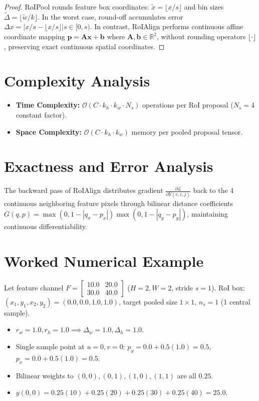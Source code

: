 \documentclass[11pt,a4paper]{article}
\theoremstyle{definition}
\begin{document}
\begin{proof}
RoIPool rounds feature box coordinates: $\tilde{x} = \lfloor x / s \rfloor$ and bin sizes $\tilde{\Delta} = \lfloor \tilde{w} / k \rfloor$. In the worst case, round-off accumulates error $\Delta x = |x/s - \lfloor x/s \rfloor| s \in [0, s)$. In contrast, RoIAlign performs continuous affine coordinate mapping $\mathbf{p} = \mathbf{A} \mathbf{x} + \mathbf{b}$ where $\mathbf{A}, \mathbf{b} \in \mathbb{R}^2$, without rounding operators $\lfloor \cdot \rfloor$, preserving exact continuous spatial coordinates.
\end{proof}

\section{Complexity Analysis}

\begin{itemize}
    \item \textbf{Time Complexity:} $\mathcal{O}(C \cdot k_h \cdot k_w \cdot N_s)$ operations per RoI proposal ($N_s = 4$ constant factor).
    \item \textbf{Space Complexity:} $\mathcal{O}(C \cdot k_h \cdot k_w)$ memory per pooled proposal tensor.
\end{itemize}

\section{Exactness and Error Analysis}

The backward pass of RoIAlign distributes gradient $\frac{\partial \mathcal{L}}{\partial Y(c, i, j)}$ back to the 4 continuous neighboring feature pixels through bilinear distance coefficients $G(q, p) = \max(0, 1-|q_x-p_x|)\max(0, 1-|q_y-p_y|)$, maintaining continuous differentiability.

\section{Worked Numerical Example}

Let feature channel $F = \begin{bmatrix} 10.0 & 20.0 \\ 30.0 & 40.0 \end{bmatrix}$ ($H=2, W=2$, stride $s=1$).
RoI box: $(x_1, y_1, x_2, y_2) = (0.0, 0.0, 1.0, 1.0)$, target pooled size $1 \times 1$, $n_s = 1$ (1 central sample).
\begin{itemize}
    \item $r_w = 1.0, r_h = 1.0 \implies \Delta_w = 1.0, \Delta_h = 1.0$.
    \item Single sample point at $u=0, v=0$:
    $p_y = 0.0 + 0.5(1.0) = 0.5$, $p_x = 0.0 + 0.5(1.0) = 0.5$.
    \item Bilinear weights to $(0,0), (0,1), (1,0), (1,1)$ are all $0.25$.
    \item $y(0,0) = 0.25(10) + 0.25(20) + 0.25(30) + 0.25(40) = 25.0$.
\end{itemize}
\end{document}
